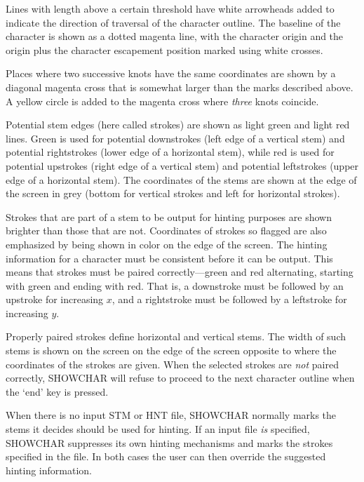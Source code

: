 Lines with length above a certain threshold have white arrowheads added to
indicate the direction of traversal of the character outline.
The baseline of the character is shown as a dotted magenta line, with
the character origin and the origin plus the character escapement
position marked using white crosses.

Places where two successive knots have the same coordinates are shown
by a diagonal magenta cross that is somewhat larger than the marks
described above. 
A yellow circle is added to the magenta cross where {\it three} knots
coincide. 

Potential stem edges (here called strokes) are shown as light green and
light red lines.
Green is used for potential downstrokes (left edge of a vertical stem)
and potential rightstrokes (lower edge of a horizontal stem), while red
is used for potential upstrokes (right edge of a vertical stem) and
potential leftstrokes (upper edge of a horizontal stem).
The coordinates of the stems are shown at the edge of the screen in grey
(bottom for vertical strokes and left for horizontal strokes).

Strokes that are part of a stem to be output for hinting purposes are
shown brighter than those that are not.
Coordinates of strokes so flagged are also emphasized by being shown
in color on the edge of the screen.
The hinting information for a character must be consistent before it
can be output. This means that strokes must be paired correctly---green
and red alternating, starting with green and ending with red.
That is, a downstroke must be followed by an upstroke for increasing $x$,
and a rightstroke must be followed by a leftstroke for increasing $y$.

Properly paired strokes define horizontal and vertical stems.
The width of such stems is shown on the screen on the edge of the
screen opposite to where the coordinates of the strokes are given.
When the selected strokes are {\it not} paired correctly, 
SHOWCHAR will refuse to proceed to the next character outline when the
`end' key is pressed.

When there is no input STM or HNT file, SHOWCHAR normally marks the
stems it decides should be used for hinting.
If an input file {\it is} specified, SHOWCHAR suppresses its own
hinting mechanisms and marks the strokes specified in the file.
In both cases the user can then override the suggested hinting information.

